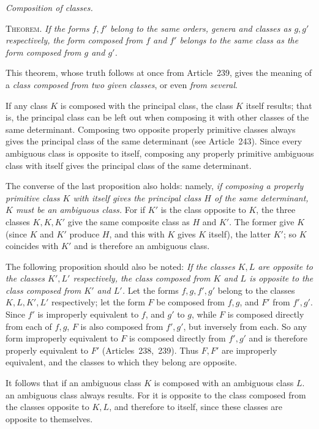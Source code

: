 \begin{center}
\textit{Composition of classes.}
\end{center}

\textsc{Theorem.} \textit{If the forms $f,f'$ belong to the same orders, genera and classes as $g,g'$ respectively, the form composed from $f$ and $f'$ belongs to the same class as the form composed from $g$ and $g'$.}

This theorem, whose truth follows at once from Article~239, gives the meaning of a \textit{class composed from two given classes}, or even \textit{from several}.

If any class $K$ is composed with the principal class, the class $K$ itself results; that is, the principal class can be left out when composing it with other classes of the same determinant. Composing two opposite properly primitive classes always gives the principal class of the same determinant (see Article~243). Since every ambiguous class is opposite to itself, composing any properly primitive ambiguous class with itself gives the principal class of the same determinant.

The converse of the last proposition also holds: namely, \textit{if composing a properly primitive class $K$ with itself gives the principal class $H$ of the same determinant, $K$ must be an ambiguous class.} For if $K'$ is the class opposite to $K$, the three classes $K,K,K'$ give the same composite class as $H$ and $K'$. The former give $K$ (since $K$ and $K'$ produce $H$, and this with $K$ gives $K$ itself), the latter $K'$; so $K$ coincides with $K'$ and is therefore an ambiguous class.

The following proposition should also be noted: \textit{If the classes $K,L$ are opposite to the classes $K',L'$ respectively, the class composed from $K$ and $L$ is opposite to the class composed from $K'$ and $L'$.} Let the forms $f,g,f',g'$ belong to the classes $K,L,K',L'$ respectively; let the form $F$ be composed from $f,g$, and $F'$ from $f',g'$. Since $f'$ is improperly equivalent to $f$, and $g'$ to $g$, while $F$ is composed directly from each of $f,g$, $F$ is also composed from $f',g'$, but inversely from each. So any form improperly equivalent to $F$ is composed directly from $f',g'$ and is therefore properly equivalent to $F'$ (Articles~238,~239). Thus $F,F'$ are improperly equivalent, and the classes to which they belong are opposite.

It follows that if an ambiguous class $K$ is composed with an ambiguous class $L$. an ambiguous class always results. For it is opposite to the class composed from the classes opposite to $K,L$, and therefore to itself, since these classes are opposite to themselves.

